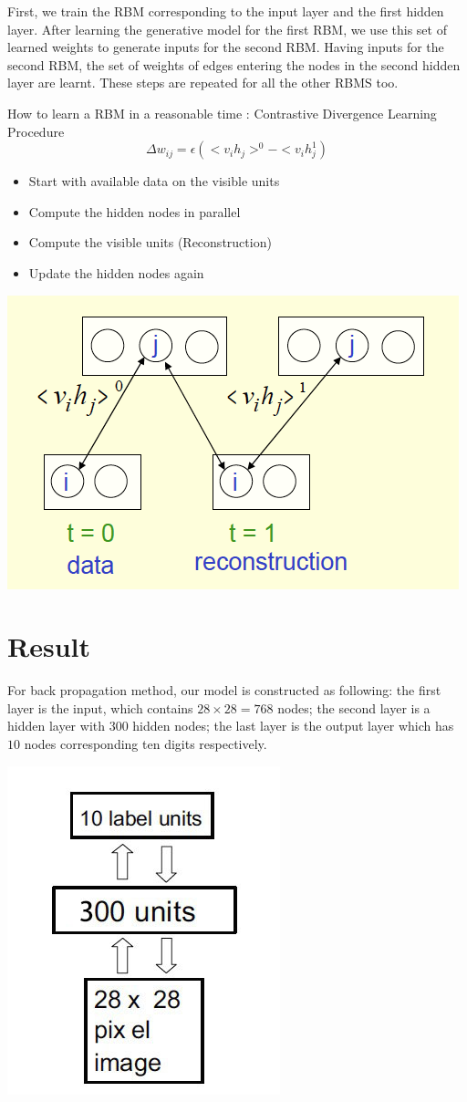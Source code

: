 \documentclass{article} %
\begin{document}
First, we train the RBM corresponding to the input layer and the first hidden layer. 
After learning the generative model for the first RBM, we use this set of learned weights to generate inputs for the second RBM. 
Having inputs for the second RBM, the set of weights of edges entering the nodes in the second hidden layer are learnt. 
These steps are repeated for all the other RBMS too.

How to learn a RBM in a reasonable time : Contrastive Divergence Learning Procedure\\
\[ \Delta w_{ij} = \epsilon (<v_{i}h_{j}>^{0} - <v_{i}h_{j}^{1}) \]
\begin{itemize}
\item Start with available data on the visible units
\item Compute the hidden nodes in parallel
\item Compute the visible units (Reconstruction)
\item Update the hidden nodes again
\end{itemize}

\begin{center}
\includegraphics[width=0.6\linewidth]{CDLP.png}
\end{center}

\section{Result}
For back propagation method, our model is constructed as following: the first layer is the input, which contains $28 \times 28 = 768$ nodes; the second layer is a hidden layer with $300$ hidden nodes; the last layer is the output layer which has $10$ nodes corresponding ten digits respectively.

\begin{center}
\includegraphics[width=0.3\linewidth]{NN_BP.jpg}
\end{center}
\end{document}
